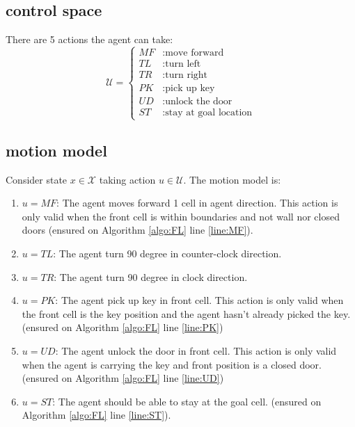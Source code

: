 \documentclass[conference]{IEEEtran}
\begin{document}
\subsection{control space}
There are 5 actions the agent can take:
$$
\mathcal{U}=
\left\{ \begin{aligned}
    MF&:\text{move forward} \\ 
    TL&:\text{turn left} \\ 
    TR&:\text{turn right} \\ 
    PK&:\text{pick up key} \\ 
    UD&:\text{unlock the door} \\
    ST&:\text{stay at goal location} 
\end{aligned} \right. 
$$

\subsection{motion model}
\label{subsec:f}
Consider state $x \in \mathcal{X}$ taking action $u \in \mathcal{U}$.
The motion model is:
\begin{enumerate}    
        \item $u = MF$:
        The agent moves forward 1 cell in agent direction. 
        This action is only valid when the front cell is within boundaries and not wall nor closed doors 
        (ensured on Algorithm \ref{algo:FL} line \ref{line:MF}).

        \item $u = TL$:
        The agent turn 90 degree in counter-clock direction.
        
        \item $u = TR$:
        The agent turn 90 degree in clock direction.
        
        \item $u = PK$:
        The agent pick up key in front cell. 
        This action is only valid when the front cell is the key position
        and the agent hasn't already picked the key.
        (ensured on Algorithm \ref{algo:FL} line \ref{line:PK})

        \item $u = UD$:
        The agent unlock the door in front cell.
        This action is only valid when the agent is carrying the key and 
        front position is a closed door.
        (ensured on Algorithm \ref{algo:FL} line \ref{line:UD})

        \item $u = ST$: 
        The agent should be able to stay at the goal cell.
        (ensured on Algorithm \ref{algo:FL} line \ref{line:ST}).
    \end{enumerate}
\end{document}
